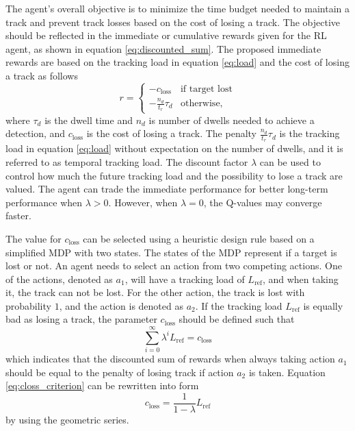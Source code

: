 \documentclass[english, 12pt, a4paper, elec, utf8, a-1b, online]{aaltothesis}
\numberwithin{equation}{section}
\newcommand{\lref}{L_\text{ref}}
\newcommand{\closs}{c_\text{loss}}
\newcommand{\ri}{t_r}
\begin{document}
The agent's overall objective is to minimize the time budget needed to maintain a track and prevent track losses based on the cost of losing a track.
The objective should be reflected in the immediate or cumulative rewards given for the RL agent, as shown in equation \eqref{eq:discounted_sum}. 
The proposed immediate rewards are based on the tracking load in equation \eqref{eq:load} and the cost of losing a track as follows
\begin{equation}
    r = \left\{
    \begin{array}{ll}
        -\closs & \text{if target lost} \\
        -\frac{n_d}{\ri} \tau_d & \text{otherwise},
    \end{array} \right.
\end{equation}
where $\tau_d$ is the dwell time and $n_d$ is number of dwells needed to achieve a detection, and $\closs$ is the cost of losing a track.
The penalty $\frac{n_d}{\ri}\tau_d$ is the tracking load in equation \eqref{eq:load} without expectation on the number of dwells, and it is referred to as temporal tracking load.
The discount factor $\lambda$ can be used to control how much the future tracking load and the possibility to lose a track are valued.
The agent can trade the immediate performance for better long-term performance when $\lambda > 0$.
However, when $\lambda = 0$, the Q-values may converge faster.

The value for $\closs$ can be selected using a heuristic design rule based on a simplified MDP with two states.
The states of the MDP represent if a target is lost or not.
An agent needs to select an action from two competing actions.
One of the actions, denoted as $a_1$, will have a tracking load of $\lref$, and when taking it, the track can not be lost.
For the other action, the track is lost with probability $1$, and the action is denoted as $a_2$.
If the tracking load $\lref$ is equally bad as losing a track, the parameter $\closs$ should be defined such that
\begin{equation}\label{eq:closs_criterion}
    \sum_{i=0}^\infty \lambda^i \lref = \closs
\end{equation}
which indicates that the discounted sum of rewards when always taking action $a_1$ should be equal to the penalty of losing track if action $a_2$ is taken.
Equation \eqref{eq:closs_criterion} can be rewritten into form
\begin{equation}
    \closs = \frac{1}{1-\lambda} \lref
\end{equation}
 by using the geometric series.
\end{document}
